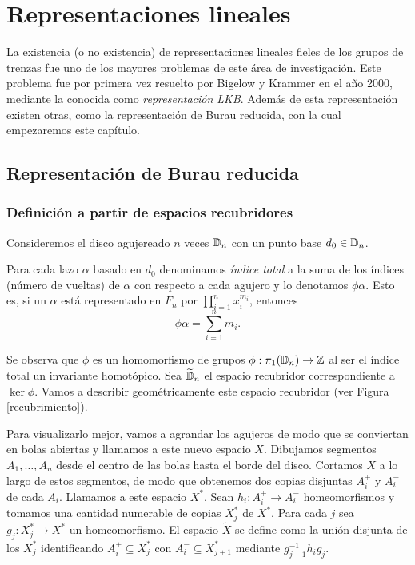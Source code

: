 \documentclass[TFG.tex]{subfiles}
\begin{document}
\chapter{Representaciones lineales}

La existencia (o no existencia) de representaciones lineales fieles de los grupos de trenzas fue uno de los mayores problemas de este área de investigación. Este problema fue por primera vez resuelto por Bigelow \cite{Bigelow} y Krammer \cite{Krammer} en el año 2000, mediante la conocida como \emph{representación LKB}. Además de esta representación existen otras, como la representación de Burau reducida, con la cual empezaremos este capítulo.

\section{Representación de Burau reducida}

%

\subsection{Definición a partir de espacios recubridores}

Consideremos el disco agujereado $n$ veces $\mathbb{D}_n$ con un punto base $d_0\in\mathbb{D}_n$. 
\begin{defi}
Para cada lazo $\alpha$ basado en $d_0$ denominamos \emph{índice total}  a la suma de los índices (número de vueltas) de $\alpha$ con respecto a cada agujero y lo denotamos $\phi\alpha$. Esto es, si un $\alpha$ está representado en $F_n$ por $\prod_{i=1}^n x_i^{m_i}$, entonces 
\[
\phi\alpha=\sum_{i=1}^nm_i.
\]
\end{defi}

Se observa que $\phi$ es un homomorfismo de grupos $\phi:\pi_1(\mathbb{D}_n)\to\mathbb{Z}$ al ser el índice total un invariante homotópico. Sea $\widetilde{\mathbb{D}}_n$ el espacio recubridor correspondiente a $\ker\phi$. Vamos a describir geométricamente este espacio recubridor (ver Figura \ref{recubrimiento}). 


Para visualizarlo mejor, vamos a agrandar los agujeros de modo que se conviertan en bolas abiertas y llamamos a este nuevo espacio $X$. Dibujamos segmentos $A_1,\dots, A_n$ desde el centro de las bolas hasta el borde del disco. Cortamos $X$ a lo largo de estos segmentos, de modo que obtenemos dos copias disjuntas $A_i^+$ y $A_i^-$ de cada $A_i$. Llamamos a este espacio $X^*$. Sean $h_i:A_i^+\to A_i^-$ homeomorfismos y tomamos una cantidad numerable de copias $X^*_j$ de $X^*$. Para cada $j$ sea $g_j:X^*_j\to X^*$ un homeomorfismo. El espacio $\widetilde{X}$ se define como la unión disjunta de los $X^*_j$ identificando $A_i^+\subseteq X^*_j$ con $A_i^-\subseteq X^*_{j+1}$ mediante $g_{j+1}^{-1}h_ig_j$.
\end{document}
